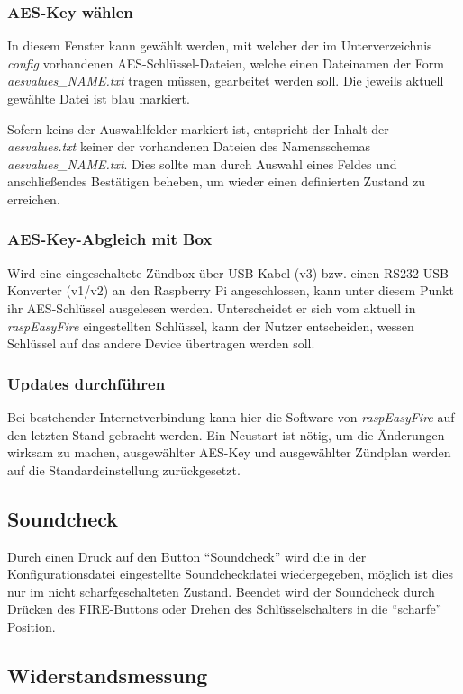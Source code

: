 \documentclass[paper=a4, parskip, numbers=noenddot, toc=listof, headsepline]{scrbook}
\newcommand{\REF}{\emph{raspEasyFire}}
\begin{document}
				\subsubsection{AES-Key wählen}
					In diesem Fenster kann gewählt werden, mit welcher der im Unterverzeichnis \emph{config} vorhandenen AES-Schlüssel-Dateien, welche einen Dateinamen der Form \emph{aesvalues\_NAME.txt} tragen müssen, gearbeitet werden soll. Die jeweils aktuell gewählte Datei ist blau markiert.

					Sofern keins der Auswahlfelder markiert ist, entspricht der Inhalt der \emph{aesvalues.txt} keiner der vorhandenen Dateien des Namensschemas \emph{aesvalues\_NAME.txt}. Dies sollte man durch Auswahl eines Feldes und anschließendes Bestätigen beheben, um wieder einen definierten Zustand zu erreichen.

				\subsubsection{AES-Key-Abgleich mit Box}
					Wird eine eingeschaltete Zündbox über USB-Kabel (v3) bzw. einen RS232-USB-Konverter (v1/v2) an den Raspberry Pi angeschlossen, kann unter diesem Punkt ihr AES-Schlüssel ausgelesen werden. Unterscheidet er sich vom aktuell in {\REF} eingestellten Schlüssel, kann der Nutzer entscheiden, wessen Schlüssel auf das andere Device übertragen werden soll.
					
			    \subsubsection{Updates durchführen}
			    	Bei bestehender Internetverbindung kann hier die Software von \REF{} auf den letzten Stand gebracht werden. Ein Neustart ist nötig, um die Änderungen wirksam zu machen, ausgewählter AES-Key und ausgewählter Zündplan werden auf die Standardeinstellung zurückgesetzt.

			\subsection{Soundcheck}

				Durch einen Druck auf den Button \enquote{Soundcheck} wird die in der Konfigurationsdatei eingestellte Soundcheckdatei wiedergegeben, möglich ist dies nur im nicht scharfgeschalteten Zustand. Beendet wird der Soundcheck durch Drücken des FIRE-Buttons oder Drehen des Schlüsselschalters in die \enquote{scharfe} Position.

			\subsection{Widerstandsmessung}
\end{document}
